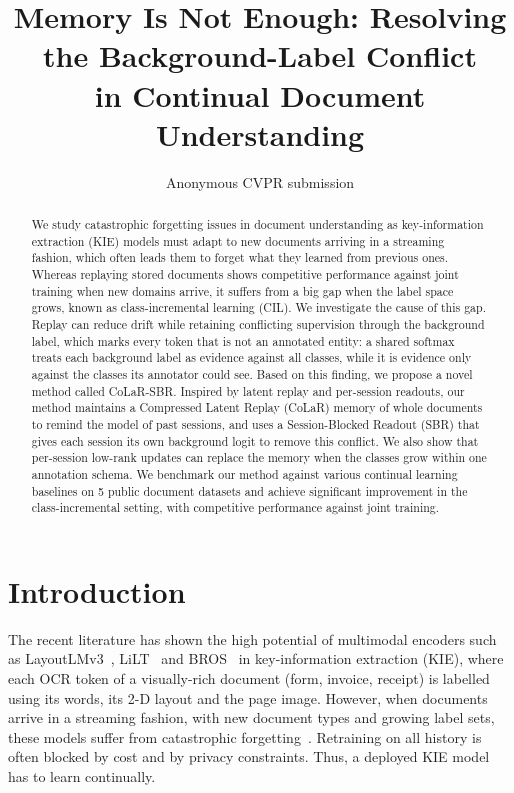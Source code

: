 \documentclass[10pt,twocolumn,letterpaper]{article}
\title{Memory Is Not Enough: Resolving the Background-Label Conflict\\in Continual Document Understanding}
\author{Anonymous CVPR submission}
\begin{document}
\maketitle

\begin{abstract}
We study catastrophic forgetting issues in document understanding as key-information extraction (KIE) models must adapt to new documents arriving in a streaming fashion, which often leads them to forget what they learned from previous ones. Whereas replaying stored documents shows competitive performance against joint training when new domains arrive, it suffers from a big gap when the label space grows, known as class-incremental learning (CIL). We investigate the cause of this gap. Replay can reduce drift while retaining conflicting supervision through the background label, which marks every token that is not an annotated entity: a shared softmax treats each background label as evidence against all classes, while it is evidence only against the classes its annotator could see. Based on this finding, we propose a novel method called CoLaR-SBR. Inspired by latent replay and per-session readouts, our method maintains a Compressed Latent Replay (CoLaR) memory of whole documents to remind the model of past sessions, and uses a Session-Blocked Readout (SBR) that gives each session its own background logit to remove this conflict. We also show that per-session low-rank updates can replace the memory when the classes grow within one annotation schema. We benchmark our method against various continual learning baselines on 5 public document datasets and achieve significant improvement in the class-incremental setting, with competitive performance against joint training.
\end{abstract}

\section{Introduction}
\label{sec:intro}

The recent literature has shown the high potential of multimodal encoders such as LayoutLMv3~\citep{huang2022layoutlmv3}, LiLT~\citep{wang2022lilt} and BROS~\citep{hong2022bros} in key-information extraction (KIE), where each OCR token of a visually-rich document (form, invoice, receipt) is labelled using its words, its 2-D layout and the page image. However, when documents arrive in a streaming fashion, with new document types and growing label sets, these models suffer from catastrophic forgetting~\citep{mccloskey1989catastrophic}. Retraining on all history is often blocked by cost and by privacy constraints. Thus, a deployed KIE model has to learn continually.
\end{document}
